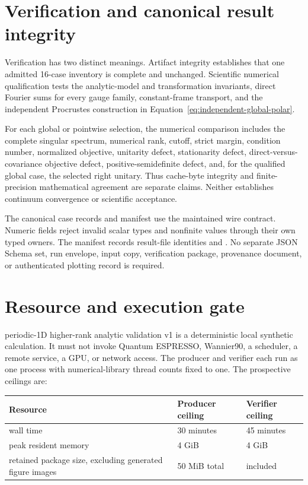 \documentclass[11pt]{article}
\begin{document}
\section{Verification and canonical result integrity}

Verification has two distinct meanings. Artifact integrity establishes that one admitted
16-case inventory is complete and unchanged. Scientific numerical qualification tests
the analytic-model and transformation invariants, direct Fourier sums for every gauge family,
constant-frame transport, and the independent Procrustes construction in
Equation~\eqref{eq:independent-global-polar}.

For each global or pointwise selection, the numerical comparison includes the complete
singular spectrum, numerical rank, cutoff, strict margin, condition number, normalized
objective, unitarity defect, stationarity defect, direct-versus-covariance objective
defect, positive-semidefinite defect, and, for the qualified global case, the selected
right unitary. Thus cache-byte integrity and finite-precision mathematical agreement are
separate claims. Neither establishes continuum convergence or scientific acceptance.

The canonical case records and manifest use the maintained  wire
contract. Numeric fields reject invalid scalar types and nonfinite values through their
own typed owners. The manifest records result-file identities and
. No separate JSON Schema set, run envelope,
input copy, verification package, provenance document, or authenticated plotting record
is required.

\section{Resource and execution gate}

periodic-1D higher-rank analytic validation v1 is a deterministic local synthetic calculation. It must not invoke Quantum
ESPRESSO, Wannier90, a scheduler, a remote service, a GPU, or network access. The
producer and verifier each run as one process with numerical-library thread counts fixed
to one. The prospective ceilings are:

\begin{center}\small
\begin{tabularx}{\textwidth}{YYY}
\toprule
\textbf{Resource} & \textbf{Producer ceiling} & \textbf{Verifier ceiling} \\
\midrule
wall time & 30 minutes & 45 minutes \\
peak resident memory & 4 GiB & 4 GiB \\
retained package size, excluding generated figure images & 50 MiB total & included \\
\bottomrule
\end{tabularx}
\end{center}
\end{document}
